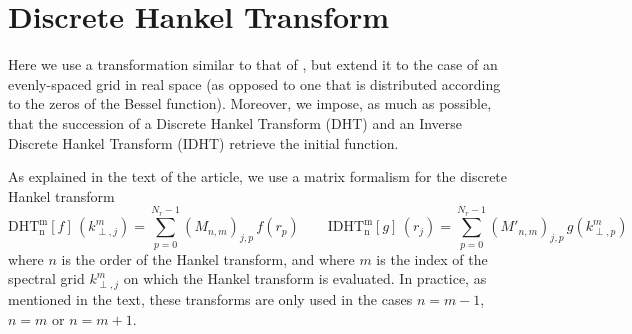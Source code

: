 \section{Discrete Hankel Transform}
\label{sec:HTMatrix}

Here we use a transformation similar to that of \cite{Yu,Guizar,KaiMing}, but
extend it to the case of an evenly-spaced grid in real space (as opposed to one
that is distributed according to the zeros of the Bessel
function). Moreover, we impose, as much as possible, that the
succession of a Discrete Hankel Transform (DHT) and an Inverse Discrete
Hankel Transform (IDHT) retrieve the initial function.

As explained in the text of the article, we use a matrix formalism for
the discrete Hankel transform
\[ \mathrm{DHT^m_n}[f] \,(k^m_{\perp,j}) = \sum_{p=0}^{N_r-1} (M_{n,m})_{j,p}
\,f(r_p) \qquad \mathrm{IDHT^m_n}[g] \, (r_j) = \sum_{p=0}^{N_r-1}
(M'_{n,m})_{j,p} \,g(k^m_{\perp,p}) \]
\noindent where $n$ is the order of the Hankel transform, and where
$m$ is the index of the spectral grid
$k^m_{\perp,j}$ on which the Hankel transform is evaluated. 
In practice, as mentioned in the text, these
transforms are only used in the cases $n=m-1$, $n=m$ or $n=m+1$.

